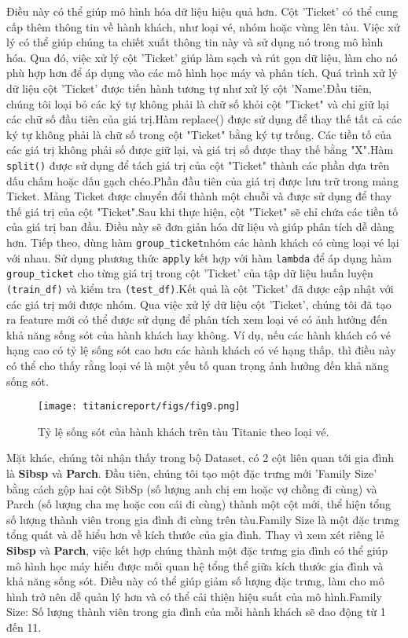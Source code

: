 \documentclass[11pt]{article}
\begin{document}
Điều này có thể giúp mô hình hóa dữ liệu hiệu quả hơn. Cột 'Ticket' có thể cung cấp thêm thông tin về hành khách, như loại vé, nhóm hoặc vùng lên tàu. Việc xử lý có thể giúp chúng ta chiết xuất thông tin này và sử dụng nó trong mô hình hóa. Qua đó, việc xử lý cột 'Ticket' giúp làm sạch và rút gọn dữ liệu, làm cho nó phù hợp hơn để áp dụng vào các mô hình học máy và phân tích. Quá trình xử lý dữ liệu cột 'Ticket' được tiến hành tương tự như xử lý cột 'Name'.Đầu tiên, chúng tôi loại bỏ các ký tự không phải là chữ số khỏi cột "Ticket" và chỉ giữ lại các chữ số đầu tiên của giá trị.Hàm replace() được sử dụng để thay thế tất cả các ký tự không phải là chữ số trong cột "Ticket" bằng ký tự trống. Các tiền tố của các giá trị không phải số được giữ lại, và giá trị số được thay thế bằng "X".Hàm \texttt{split()} được sử dụng để tách giá trị của cột "Ticket" thành các phần dựa trên dấu chấm hoặc dấu gạch chéo.Phần đầu tiên của giá trị được lưu trữ trong mảng Ticket. Mảng Ticket được chuyển đổi thành một chuỗi và được sử dụng để thay thế giá trị của cột "Ticket".Sau khi thực hiện, cột "Ticket" sẽ chỉ chứa các tiền tố của giá trị ban đầu. Điều này sẽ đơn giản hóa dữ liệu và giúp phân tích dễ dàng hơn. Tiếp theo, dùng hàm \texttt{group\_ticket}nhóm các hành khách có cùng loại vé lại với nhau. Sử dụng phương thức \texttt{apply} kết hợp với hàm \texttt{lambda} để áp dụng hàm \texttt{group\_ticket} cho từng giá trị trong cột 'Ticket' của tập dữ liệu huấn luyện \texttt{(train\_df)} và kiểm tra \texttt{(test\_df)}.Kết quả là cột 'Ticket' đã được cập nhật với các giá trị mới được nhóm. Qua việc xử lý dữ liệu cột 'Ticket', chúng tôi đã tạo ra feature mới có thể được sử dụng để phân tích xem loại vé có ảnh hưởng đến khả năng sống sót của hành khách hay không. Ví dụ, nếu các hành khách có vé hạng cao có tỷ lệ sống sót cao hơn các hành khách có vé hạng thấp, thì điều này có thể cho thấy rằng loại vé là một yếu tố quan trọng ảnh hưởng đến khả năng sống sót.\\
\begin{figure}[ht]
    \centering
    \texttt{[image: titanicreport/figs/fig9.png]}
    \caption{Tỷ lệ sống sót của hành khách trên tàu Titanic theo loại vé.}
    \label{fig:ticket}
\end{figure}
Mặt khác, chúng tôi nhận thấy trong bộ Dataset, có 2 cột liên quan tới gia đình là \textbf{Sibsp} và \textbf{Parch}. Đầu tiên, chúng tôi tạo một đặc trưng mới 'Family Size' bằng cách  gộp hai cột SibSp (số lượng anh chị em hoặc vợ chồng đi cùng) và Parch (số lượng cha mẹ hoặc con cái đi cùng) thành một cột mới, thể hiện tổng số lượng thành viên trong gia đình đi cùng trên tàu.Family Size là một đặc trưng tổng quát và dễ hiểu hơn về kích thước của gia đình. Thay vì xem xét riêng lẻ \textbf{Sibsp} và \textbf{Parch}, việc kết hợp chúng thành một đặc trưng gia đình có thể giúp mô hình học máy hiểu được mối quan hệ tổng thể giữa kích thước gia đình và khả năng sống sót. Điều này có thể giúp giảm số lượng đặc trưng, làm cho mô hình trở nên dễ quản lý hơn và có thể cải thiện hiệu suất của mô hình.Family Size: Số lượng thành viên trong gia đình của mỗi hành khách sẽ dao động từ 1 đến 11.\\
\end{document}
